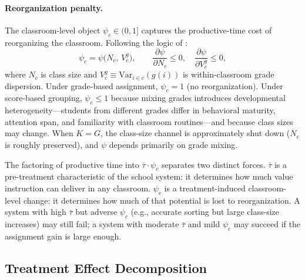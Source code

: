 \documentclass[11pt]{article}
\begin{document}
\paragraph{Reorganization penalty.} The classroom-level object $\psi_{c} \in (0, 1]$ captures the productive-time cost of reorganizing the classroom. Following the logic of \citet{Lazear2001}:
\begin{equation}
\label{eq:psi}
\psi_c = \psi\!\big(N_c,\, V^g_c\big), \qquad \frac{\partial\psi}{\partial N_c} \leq 0, \quad \frac{\partial\psi}{\partial V^g_c} \leq 0,
\end{equation}
where $N_c$ is class size and $V^g_c \equiv \text{Var}_{i \in c}(g(i))$ is within-classroom grade dispersion. Under grade-based assignment, $\psi_c = 1$ (no reorganization). Under score-based grouping, $\psi_c \leq 1$ because mixing grades introduces developmental heterogeneity---students from different grades differ in behavioral maturity, attention span, and familiarity with classroom routines---and because class sizes may change. When $K = G$, the class-size channel is approximately shut down ($N_c$ is roughly preserved), and $\psi$ depends primarily on grade mixing.

The factoring of productive time into $\bar{\tau} \cdot \psi_c$ separates two distinct forces. $\bar{\tau}$ is a pre-treatment characteristic of the school system: it determines how much value instruction can deliver in any classroom. $\psi_c$ is a treatment-induced classroom-level change: it determines how much of that potential is lost to reorganization. A system with high $\bar{\tau}$ but adverse $\psi_c$ (e.g., accurate sorting but large class-size increases) may still fail; a system with moderate $\bar{\tau}$ and mild $\psi_c$ may succeed if the assignment gain is large enough.

\subsection{Treatment Effect Decomposition}
\end{document}
